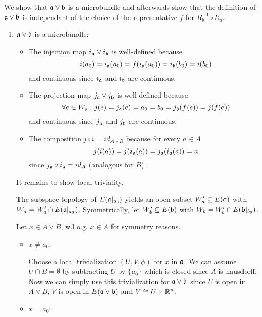 \begin{myproof}
    We show that $\mathfrak{a} \vee \mathfrak{b}$ is a microbundle and afterwards show
    that the definition of $\mathfrak{a} \vee \mathfrak{b}$ is independant of the choice of the representative $f$ for $R_b^{-1} \circ R_a$.
    \begin{enumerate}
        \item $\mathfrak{a} \vee \mathfrak{b}$ is a microbundle:
        \begin{itemize}
            \item The injection map $i_{\mathfrak{a}} \vee i_{\mathfrak{b}}$ is well-defined because 
            \[ i(a_0) = i_{\mathfrak{a}}(a_0) = f(i_{\mathfrak{a}}(a_0)) = i_{\mathfrak{b}}(b_0) = i(b_0) \]
            and continuous since $i_{\mathfrak{a}}$ and $i_{\mathfrak{b}}$ are continuous.
            \item The projection map $j_{\mathfrak{a}} \vee j_{\mathfrak{b}}$ is well-defined because
            \[ \forall e \in W_a: j(e) = j_{\mathfrak{a}}(e) = a_0 = b_0 = j_{\mathfrak{b}}(f(e)) = j(f(e)) \]
            and continuous since $j_{\mathfrak{a}}$ and $j_{\mathfrak{b}}$ are continuous.
            \item The composition $j \circ i = id_{A \vee B}$ because for every $a \in A$
            \[ j(i(a)) = j(i_{\mathfrak{a}}(a)) = j_{\mathfrak{a}}(i_{\mathfrak{a}}(a)) = a \]
            since $j_{\mathfrak{a}} \circ i_{\mathfrak{a}} = id_A$ (analogous for $B$).
        \end{itemize}
        It remains to show local triviality.

        The subspace topology of $E(\mathfrak{a}\vert_{a_0})$ yields an open subset $W_a' \subseteq{} E(\mathfrak{a})$ with $W_a = W_a' \cap E(\mathfrak{a}\vert_{a_0})$.
        Symmetrically, let $W_b' \subseteq{} E(\mathfrak{b})$ with $W_b = W_b' \cap E(\mathfrak{b}\vert_{b_0})$.

        Let $x \in A \vee B$, w.l.o.g. $x \in A$ for symmetry reasons.
        \begin{itemize}
            \item $x \neq a_0$:
            
            Choose a local trivialization $(U, V, \phi)$ for $x$ in $\mathfrak{a}$.
            We can assume $U \cap B = \emptyset$ by subtracting $U$ by $\{a_0\}$ which is closed since $A$ is hausdorff.
            Now we can simply use this trivialization for $\mathfrak{a} \vee \mathfrak{b}$ since $U$ is open in $A \vee B$, $V$ is open in $E(\mathfrak{a} \vee \mathfrak{b})$ and $V \cong U \times \mathbb{R}^n$.
            \item $x = a_0$:
            

\end{itemize}
\end{enumerate}
\end{myproof}
